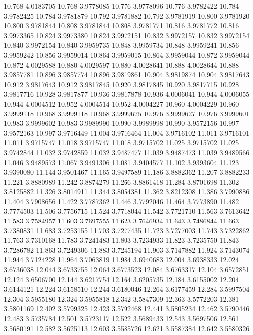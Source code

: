 10.768 4.0183705
10.768 3.9778085
10.776 3.9778096
10.776 3.9782422
10.784 3.9782425
10.784 3.9781879
10.792 3.9781882
10.792 3.9781919
10.800 3.9781920
10.800 3.9781844
10.808 3.9781844
10.808 3.9781771
10.816 3.9781772
10.816 3.9973365
10.824 3.9973380
10.824 3.9972151
10.832 3.9972157
10.832 3.9972154
10.840 3.9972154
10.840 3.9959735
10.848 3.9959734
10.848 3.9959241
10.856 3.9959242
10.856 3.9959014
10.864 3.9959015
10.864 3.9959044
10.872 3.9959044
10.872 4.0029588
10.880 4.0029597
10.880 4.0028641
10.888 4.0028644
10.888 3.9857781
10.896 3.9857774
10.896 3.9819861
10.904 3.9819874
10.904 3.9817643
10.912 3.9817643
10.912 3.9817845
10.920 3.9817845
10.920 3.9817715
10.928 3.9817716
10.928 3.9817877
10.936 3.9817878
10.936 4.0006041
10.944 4.0006055
10.944 4.0004512
10.952 4.0004514
10.952 4.0004227
10.960 4.0004229
10.960 3.9999118
10.968 3.9999118
10.968 3.9999625
10.976 3.9999627
10.976 3.9999601
10.983 3.9999602
10.983 3.9989990
10.990 3.9989998
10.990 3.9572156
10.997 3.9572163
10.997 3.9716449
11.004 3.9716464
11.004 3.9716102
11.011 3.9716101
11.011 3.9715747
11.018 3.9715747
11.018 3.9715702
11.025 3.9715702
11.025 3.9742844
11.032 3.9742859
11.032 3.9487477
11.039 3.9487473
11.039 3.9489566
11.046 3.9489573
11.067 3.9491306
11.081 3.9404577
11.102 3.9393604
11.123 3.9390080
11.144 3.9501467
11.165 3.9497589
11.186 3.8882362
11.207 3.8882233
11.221 3.8880989
11.242 3.8874279
11.266 3.8861418
11.284 3.8701698
11.302 3.8125882
11.326 3.8014911
11.344 3.8054381
11.362 3.8212308
11.386 3.7990886
11.404 3.7908656
11.422 3.7787362
11.446 3.7792046
11.464 3.7773890
11.482 3.7774503
11.506 3.7756715
11.524 3.7718044
11.542 3.7721710
11.563 3.7613642
11.583 3.7584957
11.603 3.7697555
11.623 3.7646934
11.643 3.7486844
11.663 3.7380831
11.683 3.7253155
11.703 3.7277435
11.723 3.7277003
11.743 3.7322862
11.763 3.7310168
11.783 3.7241483
11.803 3.7234933
11.823 3.7235750
11.843 3.7286782
11.863 3.7249306
11.883 3.7245194
11.903 3.7147882
11.924 3.7143074
11.944 3.7124228
11.964 3.7063819
11.984 3.6940683
12.004 3.6938333
12.024 3.6736038
12.044 3.6733755
12.064 3.6773523
12.084 3.6763317
12.104 3.6572851
12.124 3.6506700
12.144 3.6217754
12.164 3.6205735
12.184 3.6155002
12.204 3.6144121
12.224 3.6158510
12.244 3.6180046
12.264 3.6177459
12.284 3.5997504
12.304 3.5955180
12.324 3.5955818
12.342 3.5847309
12.363 3.5772203
12.381 3.5801169
12.402 3.5799325
12.423 3.5792468
12.441 3.5805234
12.462 3.5790446
12.483 3.5735784
12.501 3.5723117
12.522 3.5689433
12.543 3.5697506
12.561 3.5680191
12.582 3.5625113
12.603 3.5585726
12.621 3.5587384
12.642 3.5580326
